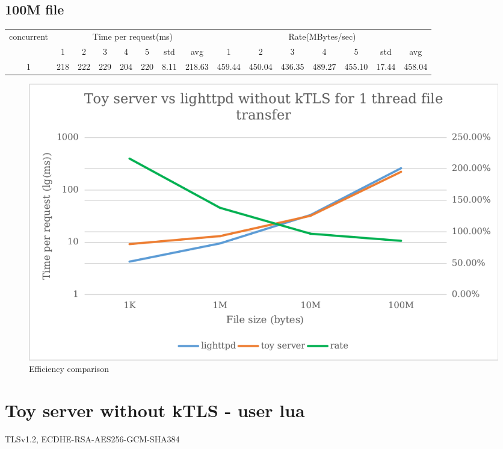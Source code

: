\documentclass{article}
\begin{document}
\subsection*{100M file}
\begin{table}[H]
    \begin{tabular}{|c|c|c|c|c|c|c|c|c|c|c|c|c|c|c|}
        \hline
        \multirow{2}{*}{concurrent} & \multicolumn{7}{c|}{Time per request(ms)} & \multicolumn{7}{c|}{Rate(MBytes/sec)}                                                                                                 \\ \cline{2-15}
                                    & 1                                         & 2                                     & 3   & 4   & 5   & std  & avg    & 1      & 2      & 3      & 4      & 5      & std   & avg    \\ \hline
        1                           & 218                                       & 222                                   & 229 & 204 & 220 & 8.11 & 218.63 & 459.44 & 450.04 & 436.35 & 489.27 & 455.10 & 17.44 & 458.04 \\ \hline
    \end{tabular}
\end{table}
\begin{figure}[H]
    \centering
    \includegraphics[scale=0.6]{pic/p2.png}
    \caption{Efficiency comparison}
\end{figure}

\section*{Toy server without kTLS - user lua}
TLSv1.2, ECDHE-RSA-AES256-GCM-SHA384
\end{document}
